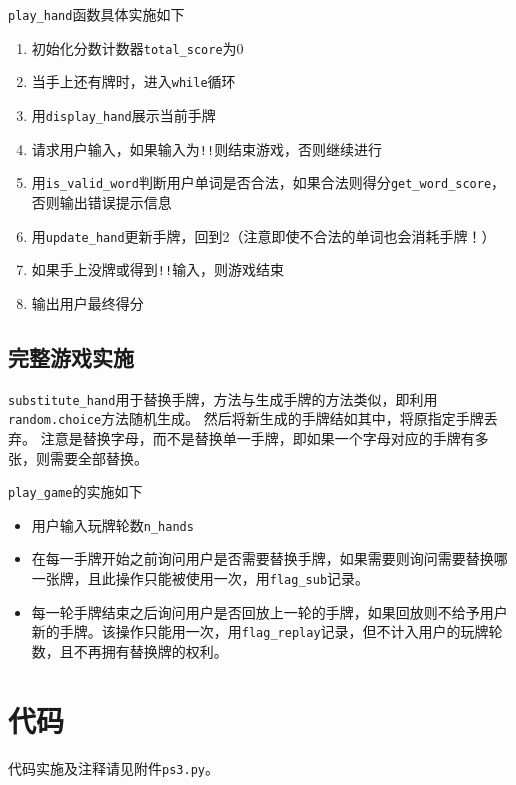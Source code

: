 \documentclass[logo,reportComp]{thesis}
\begin{document}
\verb'play_hand'函数具体实施如下
\begin{enumerate}
	\item 初始化分数计数器\verb'total_score'为0
	\item 当手上还有牌时，进入\verb'while'循环
	\item 用\verb'display_hand'展示当前手牌
	\item 请求用户输入，如果输入为\verb'!!'则结束游戏，否则继续进行
	\item 用\verb'is_valid_word'判断用户单词是否合法，如果合法则得分\verb'get_word_score'，否则输出错误提示信息
	\item 用\verb'update_hand'更新手牌，回到2（注意即使不合法的单词也会消耗手牌！）
	\item 如果手上没牌或得到\verb'!!'输入，则游戏结束
	\item 输出用户最终得分
\end{enumerate}

\subsection{完整游戏实施}
\verb'substitute_hand'用于替换手牌，方法与生成手牌的方法类似，即利用\verb'random.choice'方法随机生成。
然后将新生成的手牌结如其中，将原指定手牌丢弃。
注意是替换字母，而不是替换单一手牌，即如果一个字母对应的手牌有多张，则需要全部替换。

\verb'play_game'的实施如下
\begin{itemize}
	\item 用户输入玩牌轮数\verb'n_hands'
	\item 在每一手牌开始之前询问用户是否需要替换手牌，如果需要则询问需要替换哪一张牌，且此操作只能被使用一次，用\verb'flag_sub'记录。
	\item 每一轮手牌结束之后询问用户是否回放上一轮的手牌，如果回放则不给予用户新的手牌。该操作只能用一次，用\verb'flag_replay'记录，但不计入用户的玩牌轮数，且不再拥有替换牌的权利。
\end{itemize}

\section{代码}
代码实施及注释请见附件\verb'ps3.py'。
\end{document}
